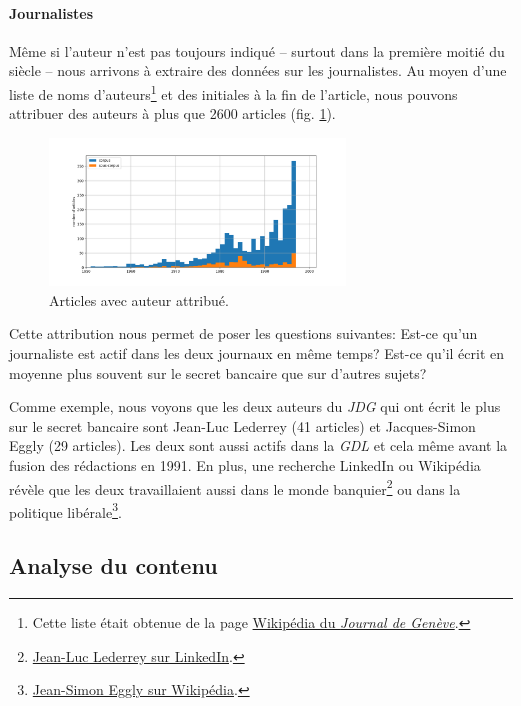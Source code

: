 \documentclass[a4paper, 11pt]{article}
\begin{document}
\hypertarget{journalistes}{%
\paragraph{Journalistes}\label{journalistes}}

Même si l'auteur n'est pas toujours indiqué -- surtout dans la première
moitié du siècle -- nous arrivons à extraire des données sur les
journalistes. Au moyen d'une liste de noms d'auteurs\footnote{Cette
  liste était obtenue de la page
  \href{https://fr.wikipedia.org/wiki/Journal_de_Gen\%C3\%A8ve}{Wikipédia
  du \emph{Journal de Genève}}.} et des initiales à la fin de l'article,
nous pouvons attribuer des auteurs à plus que 2600 articles 
(fig. \ref{attributed_authors}). 

\begin{figure}
\centering
\includegraphics[width=0.7\textwidth]{methodology/author_attributed.png}
\caption{Articles avec auteur attribué.}
\label{attributed_authors}
\end{figure}

Cette attribution nous permet de poser les questions suivantes: Est-ce
qu'un journaliste est actif dans les deux journaux en même temps? Est-ce
qu'il écrit en moyenne plus souvent sur le secret bancaire que sur
d'autres sujets?

Comme exemple, nous voyons que les deux auteurs du \emph{JDG} qui ont
écrit le plus sur le secret bancaire sont Jean-Luc Lederrey (41
articles) et Jacques-Simon Eggly (29 articles). Les deux sont aussi
actifs dans la \emph{GDL} et cela même avant la fusion des rédactions en
1991. En plus, une recherche LinkedIn ou Wikipédia révèle que les deux
travaillaient aussi dans le monde banquier\footnote{\href{https://ch.linkedin.com/in/lederrey-jean-luc-1456b717}{Jean-Luc
  Lederrey sur LinkedIn}.} ou dans la politique libérale\footnote{\href{https://fr.wikipedia.org/wiki/Jacques-Simon_Eggly}{Jean-Simon
  Eggly sur Wikipédia}.}.

\hypertarget{analyse-du-contenu}{%
\subsection{Analyse du contenu}\label{analyse-du-contenu}}
\end{document}
